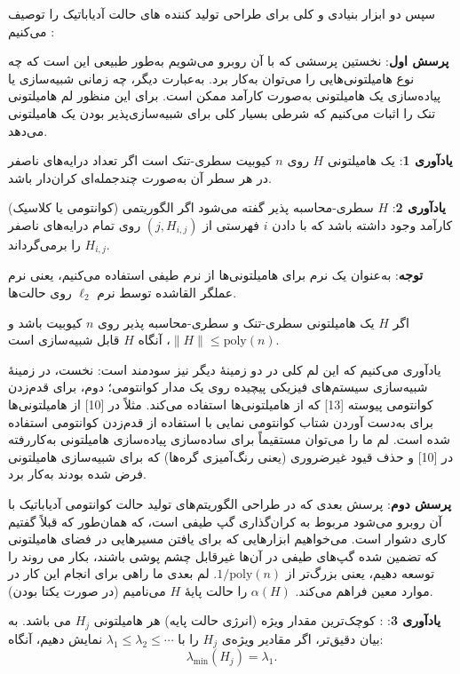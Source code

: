 سپس دو ابزار بنیادی و کلی برای طراحی تولید کننده های حالت آدیاباتیک را توصیف می‌کنیم :

\textbf{پرسش اول}:
نخستین پرسشی که با آن روبرو می‌شویم به‌طور طبیعی این است که چه نوع هامیلتونی‌هایی را می‌توان به‌کار برد. به‌عبارت دیگر، چه زمانی شبیه‌سازی یا پیاده‌سازی یک هامیلتونی به‌صورت کارآمد ممکن است. برای این منظور لم هامیلتونی تنک را اثبات می‌کنیم که شرطی بسیار کلی برای شبیه‌سازی‌پذیر بودن یک هامیلتونی می‌دهد. 

\textbf{یادآوری 1}:
یک هامیلتونی $H$ روی $n$ کیوبیت سطری-تنک است اگر تعداد درایه‌های ناصفر در هر سطر آن به‌صورت چندجمله‌ای کران‌دار باشد. 

\textbf{یادآوری 2}:
$H$ 
سطری-‌محاسبه پذیر گفته می‌شود اگر الگوریتمی (کوانتومی یا کلاسیک) کارآمد وجود داشته باشد که با دادن $i$ فهرستی از $(j, H_{i,j})$ روی تمام درایه‌های ناصفر $H_{i,j}$ را برمی‌گرداند. 

\textbf{توجه}:
به‌عنوان یک نرم برای هامیلتونی‌ها از نرم طیفی استفاده می‌کنیم، یعنی نرم عملگر القاشده توسط نرم $\ell_2$ روی حالت‌ها.

\begin{lem}
اگر $H$ یک هامیلتونی سطری-تنک و سطری-‌محاسبه پذیر روی $n$ کیوبیت باشد و $\|H\| \le \mathrm{poly}(n)$، آنگاه $H$ قابل شبیه‌سازی‌ است.	
\end{lem}
یادآوری می‌کنیم که این لم کلی در دو زمینهٔ دیگر نیز سودمند است: نخست، در زمینهٔ شبیه‌سازی سیستم‌های فیزیکی پیچیده روی یک مدار کوانتومی؛ دوم، برای قدم‌زدن کوانتومی پیوسته [13] که از هامیلتونی‌ها استفاده می‌کند. مثلاً در [10] از هامیلتونی‌ها برای به‌دست آوردن شتاب کوانتومی نمایی با استفاده از قدم‌زدن کوانتومی استفاده شده است. لم ما را می‌توان مستقیماً برای ساده‌سازی پیاده‌سازی هامیلتونی به‌کاررفته در [10] و حذف قیود غیرضروری (یعنی رنگ‌آمیزی گره‌ها) که برای شبیه‌سازی هامیلتونی فرض شده بودند به‌کار برد.

\textbf{پرسش دوم}: 
پرسش بعدی که در طراحی الگوریتم‌های تولید حالت کوانتومی آدیاباتیک با آن روبرو می‌شود مربوط به کران‌گذاری گپ طیفی است، که همان‌طور که قبلاً گفتیم کاری دشوار است. می‌خواهیم ابزارهایی که برای یافتن مسیرهایی در فضای هامیلتونی که تضمین شده گپ‌های طیفی در آن‌ها غیرقابل چشم پوشی باشند، بکار می روند را توسعه دهیم، یعنی بزرگ‌تر از $1/\mathrm{poly}(n)$. لم بعدی ما راهی برای انجام این کار در موارد معین فراهم می‌کند. $\alpha(H)$ را حالت پایهٔ $H$ می‌نامیم (در صورت یکتا بودن).

\textbf{یادآوری 3}:
:
 کوچک‌ترین مقدار ویژه (انرژی حالت پایه) هر هامیلتونی $H_j$ می باشد.  به بیان دقیق‌تر، اگر مقادیر ویژه‌ی $H_j$ را با $\lambda_1 \le \lambda_2 \le \cdots$ نمایش دهیم، آنگاه:
\[
\lambda_{\min}(H_j) = \lambda_1.
\]

